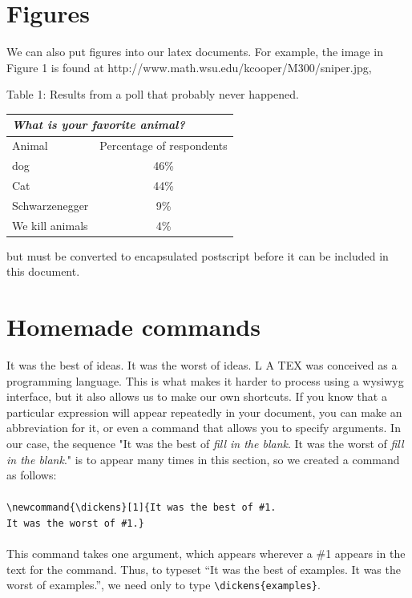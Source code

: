 \documentclass[12pt]{article}
\begin{document}
\section{Figures}
We can also put figures into our latex documents. For example, the image in
Figure 1 is found at http://www.math.wsu.edu/kcooper/M300/sniper.jpg,
\newpage
\begin{table}[h]
	\centering
	Table 1: Results from a poll that probably never happened.\\

	\begin{tabular}{||l|c||}
		\hline
		\multicolumn{2}{||l||}{\textit{What is your favorite animal?}}\\
		\hline
		Animal&Percentage of respondents\\\hline
		dog&46\%\\
		Cat&44\%\\
		Schwarzenegger&9\%\\
		We kill animals&4\%\\\hline\hline
	\end{tabular}
\end{table}
but must be converted to encapsulated postscript before it can be included
in this document.
\section{Homemade commands}
It was the best of ideas. It was the worst of ideas. L A TEX was conceived as
a programming language. This is what makes it harder to process using a
wysiwyg interface, but it also allows us to make our own shortcuts. If you
know that a particular expression will appear repeatedly in your document,
you can make an abbreviation for it, or even a command that allows you to
specify arguments. In our case, the sequence "It was the best of \textit{fill in the
blank}. It was the worst of \textit{fill in the
blank}." is to appear many times in this
section, so we created a command as follows:\\\\
\verb|\newcommand{\dickens}[1]{It was the best of #1.|\\
\verb|It was the worst of #1.}|\\\\
This command takes one argument, which appears wherever a \#1 appears
in the text for the command. Thus, to typeset “It was the best of examples.
It was the worst of examples.”, we need only to type \verb|\dickens{examples}|.
\end{document}
